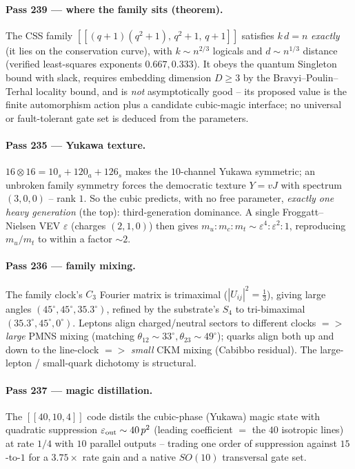 \documentclass[12pt,a4paper]{article}
\def\mathrm#1{#1}%
\def\mathbf#1{#1}%
\def\Rightarrow{ => }%
\theoremstyle{definition}
\begin{document}
\paragraph{Pass 239 --- where the family sits (theorem).} The CSS family
$[[(q{+}1)(q^2{+}1),\,q^2{+}1,\,q{+}1]]$ satisfies $k\,d=n$ \emph{exactly} (it
lies on the conservation curve), with $k\sim n^{2/3}$ logicals and $d\sim
n^{1/3}$ distance (verified least-squares exponents $0.667,0.333$). It obeys the
quantum Singleton bound with slack, requires embedding dimension $D\ge3$ by the
Bravyi--Poulin--Terhal locality bound, and is \emph{not} asymptotically good --
its proposed value is the finite automorphism action plus a candidate
cubic-magic interface; no universal or fault-tolerant gate set is
deduced from the parameters.

\paragraph{Pass 235 --- Yukawa texture.} $\mathbf{16}\otimes\mathbf{16}=
\mathbf{10}_s+\mathbf{120}_a+\mathbf{126}_s$ makes the $\mathbf{10}$-channel
Yukawa symmetric; an unbroken family symmetry forces the democratic texture
$Y=vJ$ with spectrum $(3,0,0)$ -- rank $1$. So the cubic predicts, with no free
parameter, \emph{exactly one heavy generation} (the top): third-generation
dominance. A single Froggatt--Nielsen VEV $\varepsilon$ (charges $(2,1,0)$) then
gives $m_u:m_c:m_t\sim\varepsilon^4:\varepsilon^2:1$, reproducing $m_u/m_t$ to
within a factor $\sim2$.

\paragraph{Pass 236 --- family mixing.} The family clock's $C_3$ Fourier matrix
is trimaximal ($|U_{ij}|^2=\tfrac13$), giving large angles $(45^\circ,45^\circ,
35.3^\circ)$, refined by the substrate's $S_4$ to tri-bimaximal
$(35.3^\circ,45^\circ,0^\circ)$. Leptons align charged/neutral sectors to
different clocks $\Rightarrow$ \emph{large} PMNS mixing (matching $\theta_{12}
\!\sim\!33^\circ,\theta_{23}\!\sim\!49^\circ$); quarks align both up and down to
the line-clock $\Rightarrow$ \emph{small} CKM mixing (Cabibbo residual). The
large-lepton / small-quark dichotomy is structural.

\paragraph{Pass 237 --- magic distillation.} The $[[40,10,4]]$ code distils the
cubic-phase (Yukawa) magic state with quadratic suppression $\varepsilon_{\rm
out}\sim 40\,p^2$ (leading coefficient $=$ the $40$ isotropic lines) at rate
$1/4$ with $10$ parallel outputs -- trading one order of suppression against
$15$-to-$1$ for a $3.75\times$ rate gain and a native $\mathrm{SO}(10)$
transversal gate set.
\end{document}
